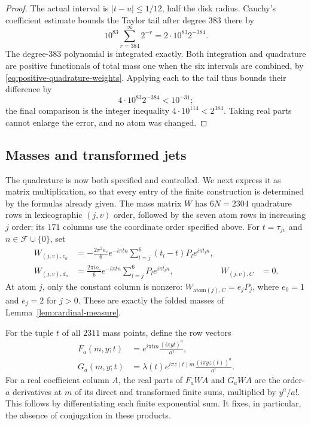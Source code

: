 \begin{proof}
The actual interval is $|t-u|\le1/12$, half the disk radius.  Cauchy's
coefficient estimate bounds the Taylor tail after degree $383$ there by
\[
 10^{83}\sum_{r=384}^{\infty}2^{-r}
 =2\cdot10^{83}2^{-384}.
\]
The degree-$383$ polynomial is integrated exactly.  Both integration and
quadrature are positive functionals of total mass one when the six intervals
are combined, by \eqref{eq:positive-quadrature-weights}.  Applying each to
the tail thus bounds their difference by
\[
 4\cdot10^{83}2^{-384}<10^{-31};
\]
the final comparison is the integer inequality $4\cdot10^{114}<2^{384}$.
Taking real parts cannot enlarge the error, and no atom was changed.
\end{proof}

\subsection{Masses and transformed jets}

The quadrature is now both specified and controlled.  We next express it as
matrix multiplication, so that every entry of the finite construction is
determined by the formulas already given.  The mass matrix $W$ has $6N=2304$
quadrature rows in lexicographic $(j,v)$ order, followed by the seven atom
rows in increasing $j$ order; its $171$ columns use the coordinate order
specified above.  For $t=\tau_{jv}$ and $n\in\mathcal F\cup\{0\}$, set
\begin{align*}
 W_{(j,v),c_n}
 &=-\frac{2\pi^2o_v}{6}e^{-i\pi tn}
       \sum_{l=j}^6(t_l-t)P_le^{i\pi t_ln},\\
 W_{(j,v),d_n}
 &=\frac{2\pi i o_v}{6}e^{-i\pi tn}
       \sum_{l=j}^6P_le^{i\pi t_ln},&
 W_{(j,v),C}&=0.
\end{align*}
At atom $j$, only the constant column is nonzero:
$W_{\mathrm{atom}(j),C}=e_jP_j$, where $e_0=1$ and $e_j=2$ for $j>0$.
These are exactly the folded masses of Lemma~\ref{lem:cardinal-measure}.

For the tuple $t$ of all $2311$ mass points, define the row vectors
\begin{equation}\label{eq:quadrature-moments}
\begin{aligned}
 F_a(m,y;t)&=e^{i\pi tm}\frac{(i\pi yt)^a}{a!},\\
 G_a(m,y;t)&=\lambda(t)e^{i\pi z(t)m}
                  \frac{(i\pi yz(t))^a}{a!}.
\end{aligned}
\end{equation}
For a real coefficient column $A$, the real parts of $F_aWA$ and $G_aWA$
are the order-$a$ derivatives at $m$ of its direct and transformed finite
sums, multiplied by $y^a/a!$.  This follows by differentiating each finite
exponential sum.  It fixes, in particular, the absence of conjugation in
these products.

